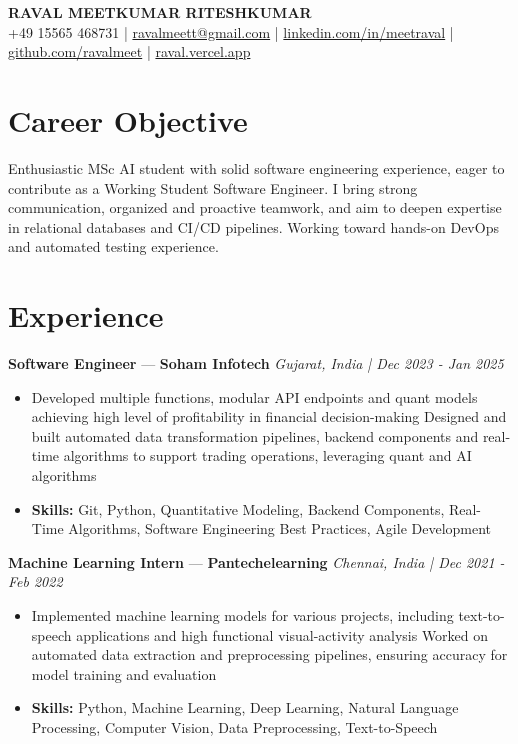 \documentclass[a4paper,10pt]{article}
\begin{document}
\begin{center}
  {\Large\bfseries RAVAL MEETKUMAR RITESHKUMAR}\\[2pt]
  {\small +49 15565 468731 \;|\; \href{mailto:ravalmeett@gmail.com}{ravalmeett@gmail.com} \;|\; \href{https://www.linkedin.com/in/meetraval/}{linkedin.com/in/meetraval} \;|\; \href{https://github.com/ravalmeet}{github.com/ravalmeet} \;|\; \href{https://raval.vercel.app/}{raval.vercel.app}}
\end{center}
\vspace{-3pt}

\section*{Career Objective}
Enthusiastic MSc AI student with solid software engineering experience, eager to contribute as a Working Student Software Engineer. I bring strong communication, organized and proactive teamwork, and aim to deepen expertise in relational databases and CI/CD pipelines. Working toward hands-on DevOps and automated testing experience.\par

\section*{Experience}
\textbf{Software Engineer} — \textbf{Soham Infotech} \hfill \textit{Gujarat, India \;|\; Dec 2023 - Jan 2025}\par
\vspace{1pt}
\begin{itemize}
  \item Developed multiple functions, modular API endpoints and quant models achieving high level of profitability in financial decision-making Designed and built automated data transformation pipelines, backend components and real-time algorithms to support trading operations, leveraging quant and AI algorithms
  \item \textbf{Skills:} Git, Python, Quantitative Modeling, Backend Components, Real-Time Algorithms, Software Engineering Best Practices, Agile Development
\end{itemize}
\vspace{3pt}
\textbf{Machine Learning Intern} — \textbf{Pantechelearning} \hfill \textit{Chennai, India \;|\; Dec 2021 - Feb 2022}\par
\vspace{1pt}
\begin{itemize}
  \item Implemented machine learning models for various projects, including text-to-speech applications and high functional visual-activity analysis Worked on automated data extraction and preprocessing pipelines, ensuring accuracy for model training and evaluation
  \item \textbf{Skills:} Python, Machine Learning, Deep Learning, Natural Language Processing, Computer Vision, Data Preprocessing, Text-to-Speech
\end{itemize}
\end{document}
